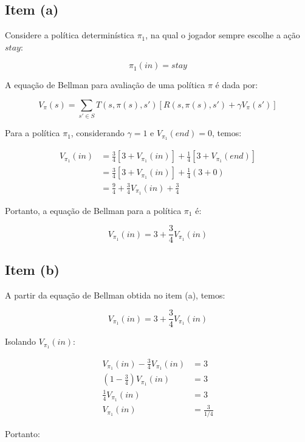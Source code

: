 \subsection{Item (a)}

Considere a política determinística $\pi_1$,
na qual o jogador sempre escolhe a ação $stay$:

\[
    \pi_1(in) = stay
\]

A equação de Bellman para avaliação de uma
política $\pi$ é dada por:

\[
    V_{\pi}(s) =
    \sum_{s' \in S} T(s,\pi(s),s')
    \left[
        R(s,\pi(s),s') + \gamma V_{\pi}(s')
    \right]
\]

Para a política $\pi_1$, considerando $\gamma = 1$
e $V_{\pi_1}(end) = 0$, temos:

\[
\begin{aligned}
    V_{\pi_1}(in)
    &= \frac{3}{4}
    \left[3 + V_{\pi_1}(in)\right]
    + \frac{1}{4}
    \left[3 + V_{\pi_1}(end)\right]
    \\[6pt]
    &= \frac{3}{4}
    \left[3 + V_{\pi_1}(in)\right]
    + \frac{1}{4}(3 + 0)
    \\[6pt]
    &= \frac{9}{4}
    + \frac{3}{4}V_{\pi_1}(in)
    + \frac{3}{4}
\end{aligned}
\]

Portanto, a equação de Bellman para a
política $\pi_1$ é:

\[
    \boxed{
        V_{\pi_1}(in) =
        3 + \frac{3}{4}V_{\pi_1}(in)
    }
\]


\subsection{Item (b)}

A partir da equação de Bellman obtida no item (a),
temos:

\[
    V_{\pi_1}(in) =
    3 + \frac{3}{4}V_{\pi_1}(in)
\]

Isolando $V_{\pi_1}(in)$:

\[
\begin{aligned}
    V_{\pi_1}(in)
    - \frac{3}{4}V_{\pi_1}(in) &= 3
    \\[6pt]
    \left(1-\frac{3}{4}\right)V_{\pi_1}(in) &= 3
    \\[6pt]
    \frac{1}{4}V_{\pi_1}(in) &= 3
    \\[6pt]
    V_{\pi_1}(in) &= \frac{3}{1/4}
\end{aligned}
\]

Portanto:

